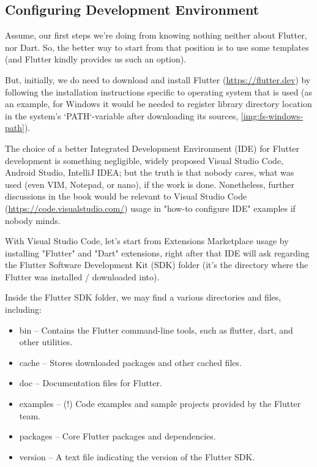 
\subsection{Configuring Development Environment}

Assume, our first steps we're doing from knowing nothing neither about Flutter, nor Dart. So, the better way to start 
from that position is to use some templates (and Flutter kindly provides us such an option).

But, initially, we do need to download and install Flutter (\href{https://flutter.dev}{https://flutter.dev}) by 
following the installation instructions specific to operating system that is used (as an example, for Windows it 
would be needed to register library directory location in the system's `PATH`-variable after downloading its sources, 
\cref{img:fs-windows-path}).


The choice of a better Integrated Development Environment (IDE) for Flutter development is something negligible, widely
proposed Visual Studio Code, Android Studio, IntelliJ IDEA; but the truth is that nobody cares, what was used (even VIM,
Notepad, or nano), if the work is done. Nonetheless, further discussions in the book would be relevant to Visual 
Studio Code (\href{https://code.visualstudio.com/}{https://code.visualstudio.com/}) usage in "how-to configure IDE" 
examples if nobody minds.

With Visual Studio Code, let's start from Extensions Marketplace usage by installing "Flutter" and "Dart" extensions, 
right after that IDE will ask regarding the Flutter Software Development Kit (SDK) folder (it's the directory where 
the Flutter was installed / downloaded into).

Inside the Flutter SDK folder, we may find a various directories and files, including:

\begin{itemize}
  \item bin -- Contains the Flutter command-line tools, such as flutter, dart, and other utilities.
  \item cache -- Stores downloaded packages and other cached files.
  \item doc -- Documentation files for Flutter.
  \item examples -- (!) Code examples and sample projects provided by the Flutter team.
  \item packages -- Core Flutter packages and dependencies.
  \item version -- A text file indicating the version of the Flutter SDK.
\end{itemize}

